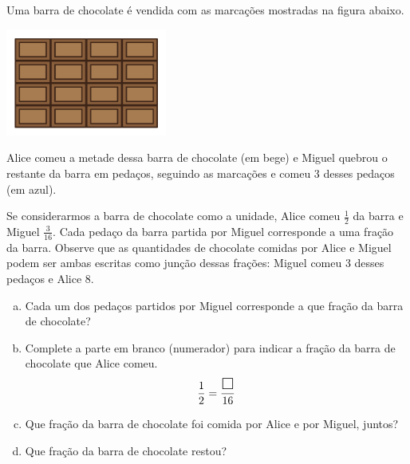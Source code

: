 \begin{atividade}[label=chap5-ativ3]{}


Uma barra de chocolate é vendida com as marcações mostradas na figura abaixo.

 \begin{center}
 \includegraphics[width=150pt, keepaspectratio]{../figuras/licao05/ativ3_fig01.png}
 \end{center}


Alice comeu a metade dessa barra de chocolate (em bege) e Miguel quebrou o restante da barra em pedaços, seguindo as marcações e comeu 3 desses pedaços (em azul).

\begin{center}
\end{center}

Se considerarmos a barra de chocolate como a unidade, Alice comeu $\frac{1}{2}$ da barra e Miguel $\frac{3}{16}$. Cada pedaço da barra partida por Miguel corresponde a uma fração da barra. Observe que as quantidades de chocolate comidas por Alice e Miguel podem ser ambas escritas como junção dessas frações: Miguel comeu 3 desses pedaços e Alice 8.
\begin{enumerate}[a)]
\item Cada um dos pedaços partidos por Miguel corresponde a que fração da barra de chocolate?
\item Complete a parte em branco (numerador) para indicar a fração da barra de chocolate que Alice comeu.
$$\frac{1}{2} = \frac{\text{\Large $\square$} }{16}$$
\item Que fração da barra de chocolate foi comida por Alice e por Miguel, juntos?
\item  Que fração da barra de chocolate restou?
\end{enumerate}
\end{atividade}

